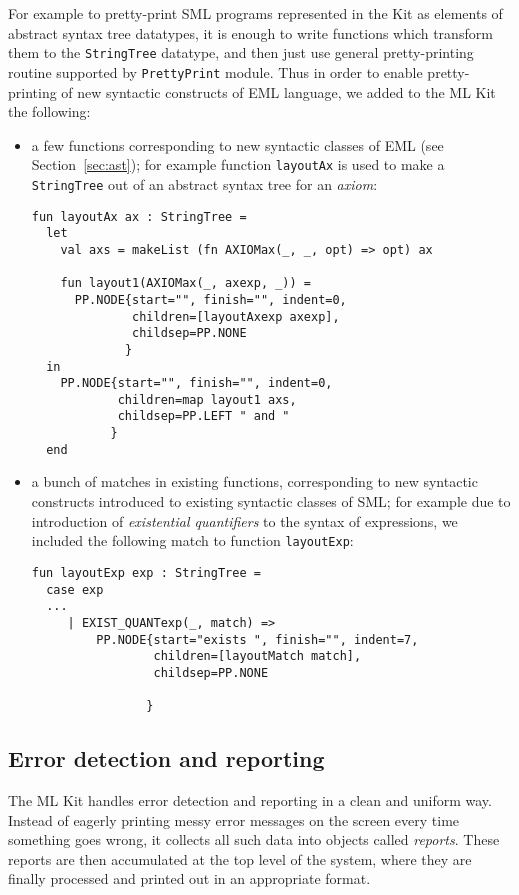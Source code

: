 For example to pretty-print SML programs represented in the Kit as
elements of abstract syntax tree datatypes, it is enough to write 
functions which transform them to the {\tt StringTree} datatype,
and then just use general pretty-printing routine supported by 
{\tt PrettyPrint} module.
Thus in order to enable pretty-printing of new syntactic constructs
of EML language, we added to the ML Kit the following:
\begin{itemize}
  \item a few functions corresponding to new syntactic classes of
EML (see Section~\ref{sec:ast}); for example function {\tt layoutAx} 
is used to make a {\tt StringTree} out of an abstract syntax tree for
an {\em axiom}:
{\small
\begin{verbatim}
fun layoutAx ax : StringTree =
  let
    val axs = makeList (fn AXIOMax(_, _, opt) => opt) ax

    fun layout1(AXIOMax(_, axexp, _)) =
      PP.NODE{start="", finish="", indent=0,
              children=[layoutAxexp axexp], 
              childsep=PP.NONE
             }
  in
    PP.NODE{start="", finish="", indent=0,
            children=map layout1 axs,
            childsep=PP.LEFT " and "
           }
  end

\end{verbatim}
}
  \item a bunch of matches in existing functions, corresponding to new
syntactic constructs introduced to existing syntactic classes of SML; for
example due to introduction of {\em existential quantifiers} to the
syntax of expressions, we included the following match to function
{\tt layoutExp}:
{\small
\begin{verbatim}
fun layoutExp exp : StringTree =
  case exp
  ...
     | EXIST_QUANTexp(_, match) =>
         PP.NODE{start="exists ", finish="", indent=7,
                 children=[layoutMatch match],
                 childsep=PP.NONE

                }
\end{verbatim}
}
\end{itemize}


\subsection{Error detection and reporting}

The ML Kit handles error detection and reporting in a clean and uniform way.
Instead of eagerly printing messy error messages on the screen every time
something goes wrong, it collects all such data into objects called 
{\em reports}. These reports are then accumulated at the top level of 
the system, where they are finally processed and printed out in 
an appropriate format.

